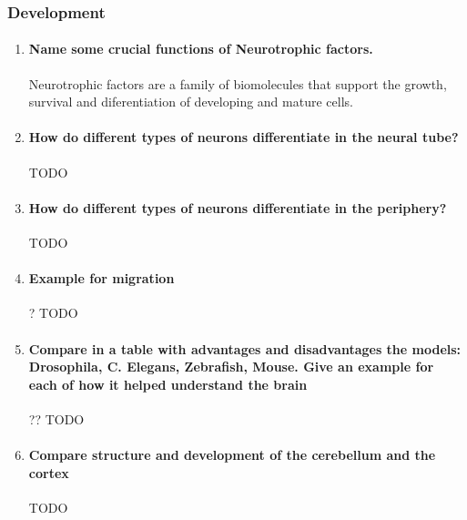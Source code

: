 \documentclass[12pt,article,oneside,a4paper]{memoir}
\begin{document}
\subsubsection{Development}
\begin{enumerate}
\item \paragraph{Name some crucial functions of Neurotrophic factors.}
Neurotrophic factors are a family of biomolecules that support the growth, survival and diferentiation of developing and mature cells.

\item \paragraph{How do different types of neurons differentiate in the neural tube?}
TODO

\item \paragraph{How do different types of neurons differentiate in the periphery?}
TODO

\item \paragraph{Example for migration} ?
TODO

\item \paragraph{Compare in a table with advantages and disadvantages the models: Drosophila, C. Elegans, Zebrafish, Mouse. Give an example for each of how it helped understand the brain} ??
TODO

\item \paragraph{Compare structure and development of the cerebellum and the cortex}
TODO


\end{enumerate}
\end{document}
